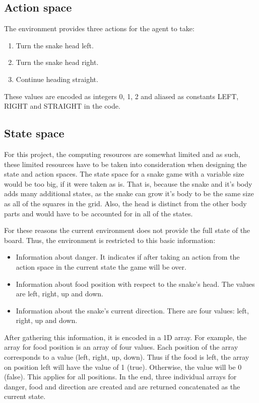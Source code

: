 \documentclass[lettersize,journal]{IEEEtran}
\begin{document}
\subsection{Action space}

The environment provides three actions for the agent to take:
\begin{enumerate}
    \item Turn the snake head left.
    \item Turn the snake head right.
    \item Continue heading straight.
\end{enumerate}
These values are encoded as integers 0, 1, 2 and aliased as
constants LEFT, RIGHT and STRAIGHT in the code.


\subsection{State space}
For this project, the computing resources are somewhat limited and
as such, these limited resources have to be taken into consideration
when designing the state and action spaces.
The state space for a snake game with a variable size would be
too big, if it were taken as is. That is, because the snake and
it's body adds many additional states, as the snake can grow it's body to
be the same size as all of the squares in the grid. Also, the head is distinct
from the other body parts and would have to be accounted for in all of the states.

For these reasons the current environment does not provide the full state of the board. Thus, the environment is restricted to
this basic information:
\begin{itemize}
    \item Information about danger. It indicates if after taking an action from the action space in the current state
        the game will be over.
    \item Information about food position with respect to the snake's head. The values are left, right, up and down.
    \item Information about the snake's current direction. There are four values: left, right, up and down.
\end{itemize}

After gathering this information, it is encoded in a 1D array. For example, the array for food position
is an array of four values. Each position of the array corresponds to a value (left, right, up, down).
Thus if the food is left, the array on position left will have the value of 1 (true). Otherwise, the
value will be 0 (false). This applies for all positions. In the end, three individual arrays for danger,
food and direction are created and are returned concatenated as the current state.
\end{document}
